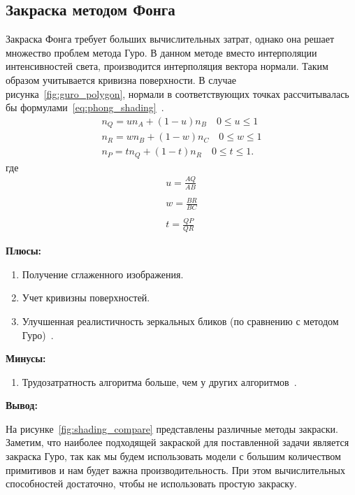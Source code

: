 \subsection{Закраска методом Фонга}
Закраска Фонга требует больших вычислительных затрат, однако она решает множество проблем метода Гуро.
В данном методе вместо интерполяции интенсивностей света, производится интерполяция вектора нормали.
Таким образом учитывается кривизна поверхности.
В случае рисунка~\ref{fig:guro_polygon}, нормали в соответствующих точках рассчитывалась бы формулами~\ref{eq:phong_shading}~\cite{Rodgers}.
\begin{equation}
	\label{eq:phong_shading}
	\begin{aligned}
		n_Q = un_A + (1-u)n_B  \quad 0 \leq u \leq 1 \\
		n_R = wn_B + (1-w)n_C  \quad 0 \leq w \leq 1 \\
		n_P = tn_Q + (1-t)n_R  \quad 0 \leq t \leq 1.
	\end{aligned}
\end{equation}
где
\begin{equation}
	\begin{aligned}
		u = \frac{AQ}{AB} \\\\
		w = \frac{BR}{BC} \\\\
		t = \frac{QP}{QR} 
	\end{aligned}
\end{equation}

\newpage

\textbf{Плюсы:}
\begin{enumerate}
	\item Получение сглаженного изображения.
	\item Учет кривизны поверхностей.
	\item Улучшенная реалистичность зеркальных бликов (по сравнению с методом Гуро)~\cite{Rodgers}.
\end{enumerate}

\textbf{Минусы:}
\begin{enumerate} 
	\item Трудозатратность алгоритма больше, чем у других алгоритмов~\cite{Rodgers}.
\end{enumerate}


\textbf{Вывод:}

На рисунке~\ref{fig:shading_compare} представлены различные методы закраски. 
Заметим, что наиболее подходящей закраской для поставленной задачи является закраска Гуро, так как мы будем использовать модели с большим количеством примитивов и нам будет важна производительность. При этом вычислительных способностей достаточно, чтобы не использовать простую закраску.

